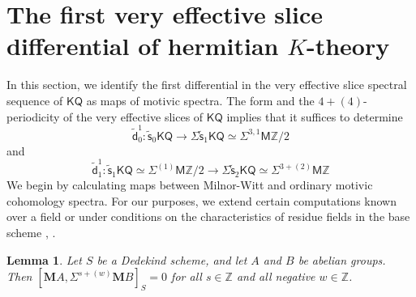 \documentclass[11pt,hyp,english]{article}
\newcommand{\Z}{\mathbb{Z}}
\newcommand{\Q}{\mathbb{Q}}
\newcommand{\KGL}{\mathsf{KGL}}
\newcommand{\KQ}{\mathsf{KQ}}
\newcommand{\MZ}{\mathsf{M}\Z}
\newcommand{\MA}{\mathbf{M}A}
\newcommand{\MB}{\mathbf{M}B}
\newcommand{\vs}{\tilde{\mathsf{s}}}
\newcommand{\vd}{{\tilde{\mathsf{d}}}}
\newcommand{\Forg}{\mathsf{Forg}}
\newcommand{\Hyper}{\mathsf{Hyp}}
\newtheorem{lemma}[theorem]{Lemma}
\theoremstyle{definition}
\begin{document}





\section{The first very effective slice differential of hermitian $K$-theory}
\label{section:tfvesdfkq}
In this section, 
we identify the first differential in the very effective slice spectral sequence of $\KQ$ as maps of motivic spectra.
The form and the $4+(4)$-periodicity of the very effective slices of $\KQ$ implies that it suffices to determine 
\[\vd^1_0\colon \vs_0\KQ \to \Sigma \vs_1\KQ  \simeq \Sigma^{3,1} \MZ/2\] and 
$$\vd^1_1\colon \vs_1\KQ \simeq\Sigma^{(1)}\MZ/2 \to \Sigma \vs_2\KQ \simeq\Sigma^{3+(2)}\MZ$$
We begin by calculating maps between Milnor-Witt and ordinary motivic cohomology spectra.
For our purposes, 
we extend certain computations known over a field or under conditions on the characteristics 
of residue fields in the base scheme \cite[Appendix A]{RO:slices}, \cite{Voevodsky:power}.

\begin{lemma}\label{lem:endo-mz-weightneg}
Let $S$ be a Dedekind scheme, and let $A$ and $B$ be abelian groups.
Then $[\MA,\Sigma^{s+(w)}\MB]_S=0$ for all $s\in \Z$ and all negative $w\in \Z$.
\end{lemma}
\end{document}
